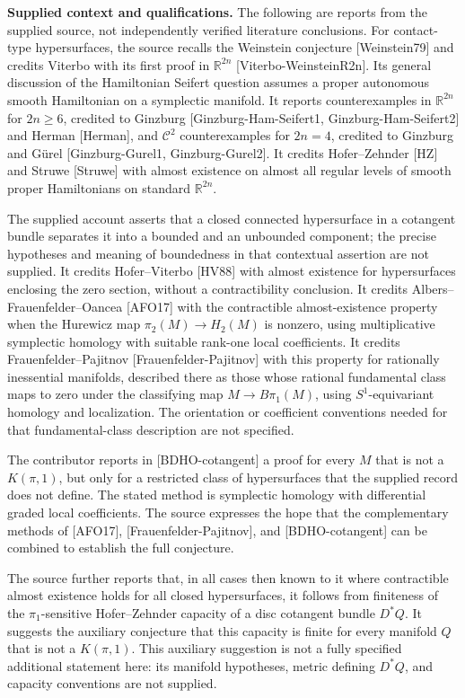 \documentclass[11pt]{article}
\newcommand{\R}{\mathbb{R}}
\begin{document}
\textbf{Supplied context and qualifications.} The following are reports from the supplied source, not independently verified literature conclusions. For contact-type hypersurfaces, the source recalls the Weinstein conjecture [Weinstein79] and credits Viterbo with its first proof in \(\R^{2n}\) [Viterbo-WeinsteinR2n]. Its general discussion of the Hamiltonian Seifert question assumes a proper autonomous smooth Hamiltonian on a symplectic manifold. It reports counterexamples in \(\R^{2n}\) for \(2n\geq6\), credited to Ginzburg [Ginzburg-Ham-Seifert1, Ginzburg-Ham-Seifert2] and Herman [Herman], and \(\mathcal C^2\) counterexamples for \(2n=4\), credited to Ginzburg and G\"urel [Ginzburg-Gurel1, Ginzburg-Gurel2]. It credits Hofer--Zehnder [HZ] and Struwe [Struwe] with almost existence on almost all regular levels of smooth proper Hamiltonians on standard \(\R^{2n}\).

The supplied account asserts that a closed connected hypersurface in a cotangent bundle separates it into a bounded and an unbounded component; the precise hypotheses and meaning of boundedness in that contextual assertion are not supplied. It credits Hofer--Viterbo [HV88] with almost existence for hypersurfaces enclosing the zero section, without a contractibility conclusion. It credits Albers--Frauenfelder--Oancea [AFO17] with the contractible almost-existence property when the Hurewicz map \(\pi_2(M)\to H_2(M)\) is nonzero, using multiplicative symplectic homology with suitable rank-one local coefficients. It credits Frauenfelder--Pajitnov [Frauenfelder-Pajitnov] with this property for rationally inessential manifolds, described there as those whose rational fundamental class maps to zero under the classifying map \(M\to B\pi_1(M)\), using \(S^1\)-equivariant homology and localization. The orientation or coefficient conventions needed for that fundamental-class description are not specified.

The contributor reports in [BDHO-cotangent] a proof for every \(M\) that is not a \(K(\pi,1)\), but only for a restricted class of hypersurfaces that the supplied record does not define. The stated method is symplectic homology with differential graded local coefficients. The source expresses the hope that the complementary methods of [AFO17], [Frauenfelder-Pajitnov], and [BDHO-cotangent] can be combined to establish the full conjecture.

The source further reports that, in all cases then known to it where contractible almost existence holds for all closed hypersurfaces, it follows from finiteness of the \(\pi_1\)-sensitive Hofer--Zehnder capacity of a disc cotangent bundle \(D^*Q\). It suggests the auxiliary conjecture that this capacity is finite for every manifold \(Q\) that is not a \(K(\pi,1)\). This auxiliary suggestion is not a fully specified additional statement here: its manifold hypotheses, metric defining \(D^*Q\), and capacity conventions are not supplied.
\end{document}
